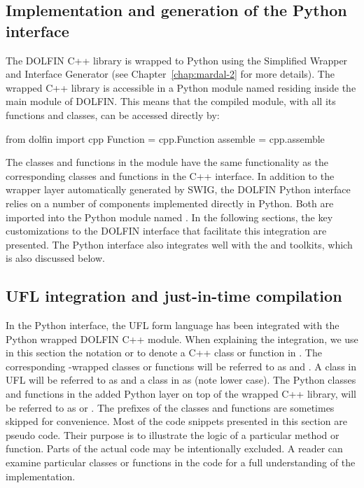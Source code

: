 \subsection{Implementation and generation of the Python interface}

The DOLFIN C++ library is wrapped to Python using the Simplified
Wrapper and Interface Generator \swig \citep{Beazley2006,www:swig}
(see Chapter~\ref{chap:mardal-2} for more details). The wrapped C++
library is accessible in a Python module named  residing inside the
main  module of DOLFIN. This means that the compiled
module, with all its functions and classes, can be accessed directly
by:
\begin{python}
from dolfin import cpp
Function = cpp.Function
assemble = cpp.assemble
\end{python}
The classes and functions in the  module have the same
functionality as the corresponding classes and functions in the C++
interface. In addition to the wrapper layer automatically generated
by SWIG, the DOLFIN Python interface relies on a number of components
implemented directly in Python. Both are imported into the Python module
named . In the following sections, the key customizations to
the DOLFIN interface that facilitate this integration are presented. The
Python interface also integrates well with the \numpy and \scipy toolkits,
which is also discussed below.


\pagebreak

\subsection{UFL integration and just-in-time compilation}

In the Python interface, the UFL form language has been integrated
with the Python wrapped DOLFIN C++ module.  When explaining the
integration, we use in this section the notation 
or  to denote a C++ class or function in \dolfin. The
corresponding \swig-wrapped classes or functions will be referred to
as  and . A class in UFL will be referred
to as  and a class in \ufc as  (note lower
case). The Python classes and functions in the added Python layer on
top of the wrapped C++ library, will be referred to as 
or . The prefixes of the classes and functions are
sometimes skipped for convenience. Most of the code snippets presented
in this section are pseudo code. Their purpose is to illustrate the
logic of a particular method or function. Parts of the actual code may
be intentionally excluded. A reader can examine particular classes or
functions in the code for a full understanding of the implementation.

